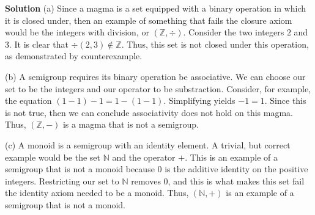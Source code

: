 \documentclass[12pt, a4paper]{article}
\begin{document}
\begin{flushleft}
\textbf{Solution}\vspace*{3mm}\linebreak
\hspace*{10mm}(a) Since a magma is a set equipped with a binary operation in which it is\linebreak
\hspace*{16.7mm}closed under, then an example of something that fails the closure axiom\linebreak
\hspace*{16.7mm}would be the integers with division, or $(\mathbb{Z}, \div)$. Consider the two integers\linebreak
\hspace*{16.7mm}$2$ and $3$. It is clear that $\div(2, 3)\notin\mathbb{Z}$. Thus, this set is not closed under\linebreak
\hspace*{16.7mm}this operation, as demonstrated by counterexample.\vspace*{3mm}\linebreak

\hspace*{10mm}(b) A semigroup requires its binary operation be associative. We can choose\linebreak
\hspace*{16.7mm}our set to be the integers and our operator to be substraction. Consider, for\linebreak
\hspace*{16.7mm}example, the equation $(1-1)-1=1-(1-1)$. Simplifying yields $-1=1$. 
\hspace*{16.7mm}Since this is not true, then we can conclude associativity does not hold on\linebreak
 \hspace*{16.7mm}this magma. Thus, $(\mathbb{Z}, -)$ is a magma that is not a semigroup.\vspace*{3mm}\linebreak

\hspace*{10mm}(c) A monoid is a semigroup with an identity element. A trivial, but correct\linebreak
\hspace*{16.7mm}example would be the set $\mathbb{N}$ and the operator $+$. This is an example\linebreak
\hspace*{16.7mm}of a semigroup that is not a monoid because $0$ is the additive identity on\linebreak
\hspace*{16.7mm}the positive integers. Restricting our set to $\mathbb{N}$ removes $0$, and this is what    \hspace*{16.7mm}makes this set fail the identity axiom needed to be a monoid. Thus, $(\mathbb{N}, +)$ is \hspace*{16.7mm}an example of a semigroup that is not a monoid.\vspace*{3mm}\linebreak


\end{flushleft}
\end{document}
